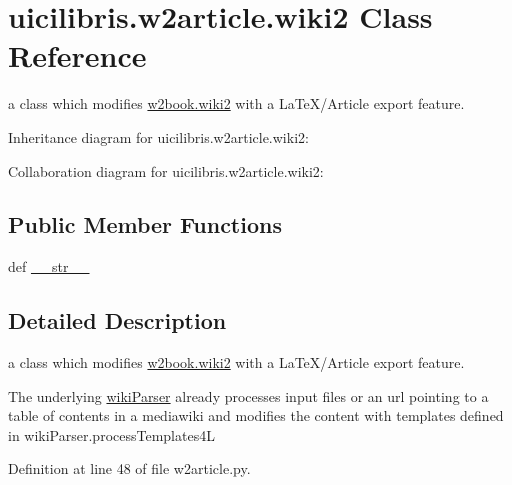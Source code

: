 \hypertarget{classuicilibris_1_1w2article_1_1wiki2}{\section{uicilibris.\-w2article.\-wiki2 \-Class \-Reference}
\label{classuicilibris_1_1w2article_1_1wiki2}
}


a class which modifies \hyperlink{classuicilibris_1_1w2book_1_1wiki2}{w2book.\-wiki2} with a \-La\-Te\-X/\-Article export feature.  




\-Inheritance diagram for uicilibris.\-w2article.\-wiki2\-:


\-Collaboration diagram for uicilibris.\-w2article.\-wiki2\-:
\subsection*{\-Public \-Member \-Functions}
\begin{DoxyCompactItemize}
\item 
def \hyperlink{classuicilibris_1_1w2article_1_1wiki2_af05069c6f9b62a40cb0ca4fb142769c9}{\-\_\-\-\_\-str\-\_\-\-\_\-}
\end{DoxyCompactItemize}


\subsection{\-Detailed \-Description}
a class which modifies \hyperlink{classuicilibris_1_1w2book_1_1wiki2}{w2book.\-wiki2} with a \-La\-Te\-X/\-Article export feature. 

\-The underlying \hyperlink{namespaceuicilibris_1_1wikiParser}{wiki\-Parser} already processes input files or an url pointing to a table of contents in a mediawiki and modifies the content with templates defined in wiki\-Parser.\-process\-Templates4\-L 

\-Definition at line 48 of file w2article.\-py.



